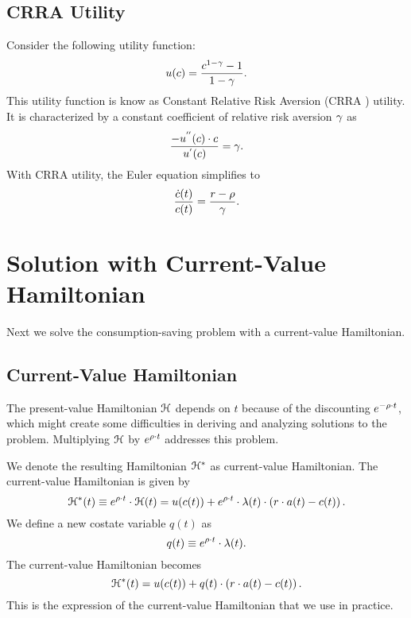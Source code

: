 \documentclass[letterpaper,12pt,leqno]{article}
\begin{document}
\subsection{CRRA Utility}

Consider the following utility function:
\begin{equation*}
u(c) =\frac{c^{1-\gamma }-1}{1-\gamma }.
\end{equation*}
This utility function is know as Constant Relative Risk Aversion (CRRA ) utility. It is characterized by a constant coefficient of relative risk aversion $\gamma$ as
\[\frac{-u^{''}(c) \cdot  c}{u^{'}(c)}=\gamma.\]
With CRRA utility, the Euler equation simplifies to
\begin{equation*}
\frac{\dot{c}(t)}{c(t)}=\frac{r-\rho}{\gamma}.
\end{equation*}

\section{Solution with Current-Value Hamiltonian}

Next we solve the consumption-saving problem with a current-value Hamiltonian.

\subsection{Current-Value Hamiltonian}

The present-value Hamiltonian $\mathcal{H}$ depends on $t$ because of the discounting $e^{-\rho \cdot t}$, which might create some difficulties in deriving and analyzing solutions to the problem. Multiplying $\mathcal{H}$ by $e^{\rho \cdot t}$ addresses this problem. 

We denote the resulting Hamiltonian $\mathcal{H}^{*}$ as current-value Hamiltonian. The current-value Hamiltonian is given by
\begin{equation*}
\mathcal{H}^{*}(t)\equiv e^{\rho \cdot t}\cdot  \mathcal{H}(t)=u(c(t)) +e^{\rho \cdot t} \cdot \lambda(t) \cdot \left( r\cdot a(t)-c(t) \right).
\end{equation*}
We define a new costate variable $q(t)$ as
\begin{equation*}
q(t)\equiv  e^{\rho \cdot t} \cdot \lambda(t).
\end{equation*}
The current-value Hamiltonian becomes
\begin{equation*}
\mathcal{H}^{*}(t)= u(c(t)) +q(t) \cdot \left( r\cdot a(t)-c(t) \right).
\end{equation*}
This is the expression of the current-value Hamiltonian that we use in practice.
\end{document}
